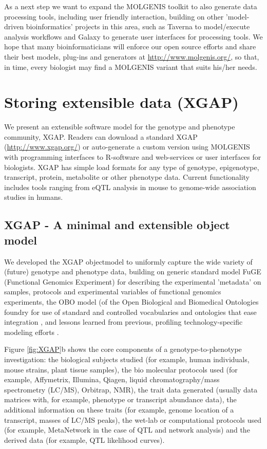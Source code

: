 As a next step we want to expand the MOLGENIS toolkit to also generate data processing tools, 
including user friendly interaction, building on other 'model-driven bioinformatics' projects 
in this area, such as Taverna \cite{Oinn:2004} to model/execute analysis workflows and Galaxy 
\cite{Goecks:2010} to generate user interfaces for processing tools. We hope that many 
bioinformaticians will enforce our open source efforts and share their best models, 
plug-ins and generators at \url{http://www.molgenis.org/}, so that, in time, every biologist may 
find a MOLGENIS variant that suits his/her needs.

\section{Storing extensible data (XGAP)}
We present an extensible software model for the genotype and phenotype community, XGAP. Readers 
can download a standard XGAP (\url{http://www.xgap.org/}) or auto-generate a custom version using 
MOLGENIS with programming interfaces to R-software and web-services or user interfaces for 
biologists. XGAP has simple load formats for any type of genotype, epigenotype, transcript, 
protein, metabolite or other phenotype data. Current functionality includes tools ranging 
from eQTL analysis in mouse to genome-wide association studies in humans.

\subsection{XGAP - A minimal and extensible object model}
We developed the XGAP objectmodel to uniformly capture the wide variety of (future) genotype 
and phenotype data, building on generic standard model FuGE (Functional Genomics Experiment) 
\cite{Jones:2007} for describing the experimental 'metadata' on samples, protocols and experimental variables 
of functional genomics experiments, the OBO model (of the Open Biological and Biomedical 
Ontologies foundry for use of standard and controlled vocabularies and ontologies that ease 
integration \cite{Smith:2007}, and lessons learned from previous, profiling 
technology-specific modeling efforts \cite{Brazma:2006}.

Figure \ref{fig:XGAP}b shows the core components of a genotype-to-phenotype investigation: the biological 
subjects studied (for example, human individuals, mouse strains, plant tissue samples), the 
bio molecular protocols used (for example, Affymetrix, Illumina, Qiagen, liquid 
chromatography/mass spectrometry (LC/MS), Orbitrap, NMR), the trait data generated (usually 
data matrices with, for example, phenotype or transcript abundance data), the additional 
information on these traits (for example, genome location of a transcript, masses of LC/MS peaks), 
the wet-lab or computational protocols used (for example, MetaNetwork \cite{Fu:2007} in the case of QTL and
network analysis) and the derived data (for example, QTL likelihood curves).

